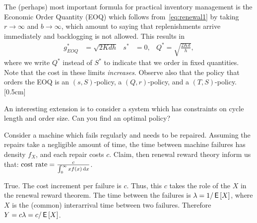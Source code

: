 \documentclass[stochastic-or.tex]{subfiles}
\begin{document}
The (perhaps) most important formula for practical inventory management is the Economic Order Quantity (EOQ) which follows from~\cref{eq:renewal1} by taking $r\to \infty$ and $b\to\infty$, which amount to saying that replenishments arrive immediately and backlogging is not allowed.
This results in
\begin{align*}
g^{*}_{EOQ} &= \sqrt{2Kdh} & s^{*} &= 0, & Q^{*} = \sqrt{\frac{2Kd}{h}},
\end{align*}
where we write $Q^{*}$  instead of $S^{*}$ to indicate that we order in fixed quantities.
Note that the cost in these limits \emph{increases}.
Observe also that the policy that orders the EOQ is an $(s,S)$-policy, a $(Q,r)$-policy, and a $(T,S)$-policy.[0.5cm]

An interesting extension is to consider a system which has  constraints on cycle length and order size. Can you find an optimal policy?



\begin{truefalse}
Consider a machine which fails regularly and needs to be repaired.
Assuming the repairs take a negligible amount of time, the time between machine failures has density $f_X$, and each repair costs $c$.
Claim, then renewal reward theory inform us that: $\text{cost rate} = \frac{c}{\int_{0}^{\infty} x f(x) \,\textrm{d}x}$.
\begin{solution}
        True. The cost increment per failure is $c$. Thus, this $c$ takes the role of the $X$ in the renewal reward theorem. The time between the failures is $\lambda= 1/\,\mathsf{E}\left[X\right]$, where $X$ is the (common) interarrival time between two failures. Therefore $Y = c \lambda = c/ \,\mathsf{E}\left[X\right]$.
\end{solution}
\end{truefalse}
\end{document}
